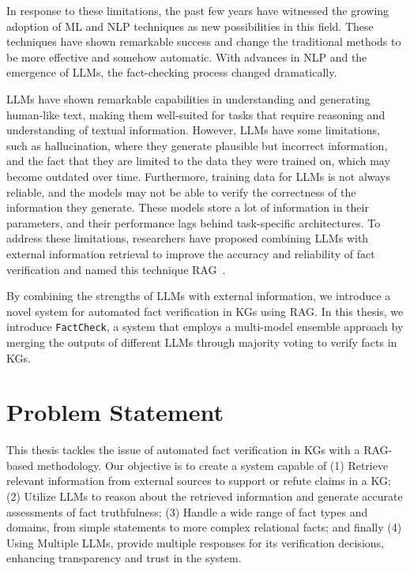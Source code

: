 In response to these limitations, the past few years have witnessed the growing adoption of \ac{ML} and \ac{NLP} techniques as new possibilities in this field.
These techniques have shown remarkable success and change the traditional methods to be more effective and somehow automatic.
With advances in \ac{NLP} and the emergence of \acp{LLM}, the fact-checking process changed dramatically.

\acp{LLM} have shown remarkable capabilities in understanding and generating human-like text, making them well-suited for tasks that require reasoning and understanding of textual information.
However, \acp{LLM} have some limitations, such as hallucination, where they generate plausible but incorrect information, and the fact that they are limited to the data they were trained on, which may become outdated over time.
Furthermore, training data for \acp{LLM} is not always reliable, and the models may not be able to verify the correctness of the information they generate.
These models store a lot of information in their parameters, and their performance lags behind task-specific architectures.
To address these limitations, researchers have proposed combining \acp{LLM} with external information retrieval to improve the accuracy and reliability of fact verification and named this technique \ac{RAG}~\cite{lewis2021retrievalaugmentedgenerationknowledgeintensivenlp}.

By combining the strengths of \acp{LLM} with external information, we introduce a novel system for automated fact verification in \acp{KG} using \ac{RAG}.
In this thesis, we introduce \texttt{FactCheck}, a system that employs a multi-model ensemble approach by merging the outputs of different LLMs through majority voting to verify facts in KGs.

\newpage
\section{Problem Statement}\label{sec:problem}
This thesis tackles the issue of automated fact verification in \acp{KG} with a RAG-based methodology.
Our objective is to create a system capable of
(1) Retrieve relevant information from external sources to support or refute claims in a \ac{KG};
(2) Utilize \acp{LLM} to reason about the retrieved information and generate accurate assessments of fact truthfulness;
(3) Handle a wide range of fact types and domains, from simple statements to more complex relational facts;
and finally (4) Using Multiple \acp{LLM}, provide multiple responses for its verification decisions, enhancing transparency and trust in the system.


